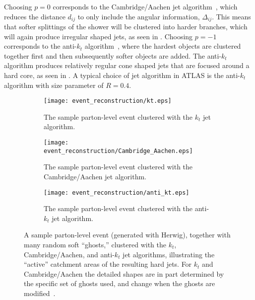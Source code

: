Choosing $p=0$ corresponds to the Cambridge/Aachen jet algorithm~\cite{Dokshitzer:1997in}, which reduces the distance $d_{ij}$ to only include the angular information, $\Delta_{ij}$.
This means that softer splittings of the shower will be clustered into harder branches, which will again produce irregular shaped jets, as seen in .
Choosing $p=-1$ corresponds to the anti-$k_{t}$ algorithm~\cite{Cacciari:2008gp}, where the hardest objects are clustered together first and then subsequently softer objects are added.
The anti-$k_{t}$ algorithm produces relatively regular cone shaped jets that are focused around a hard core, as seen in .
A typical choice of jet algorithm in ATLAS is the anti-$k_{t}$ algorithm with size parameter of $R=0.4$.

\begin{figure}[htbp]
 \centering
 \begin{subfigure}[t]{0.315\textwidth}
  \centering
  \texttt{[image: event\_reconstruction/kt.eps]}
  \caption[The sample parton-level event clustered with the $k_{t}$ jet algorithm.]{%
   The sample parton-level event clustered with the $k_{t}$ jet algorithm.}
  \label{fig:jet_algorithms_kt}
 \end{subfigure}%
 \quad
 \begin{subfigure}[t]{0.315\textwidth}
  \centering
  \texttt{[image: event\_reconstruction/Cambridge\_Aachen.eps]}
  \caption[The sample parton-level event clustered with the Cambridge/Aachen jet algorithm.]{%
   The sample parton-level event clustered with the Cambridge/Aachen jet algorithm.}
  \label{fig:jet_algorithms_Cambridge_Aachen}
 \end{subfigure}%
 \quad
 \begin{subfigure}[t]{0.315\textwidth}
  \centering
  \texttt{[image: event\_reconstruction/anti\_kt.eps]}
  \caption[The sample parton-level event clustered with the anti-$k_{t}$ jet algorithm.]{%
   The sample parton-level event clustered with the anti-$k_{t}$ jet algorithm.}
  \label{fig:jet_algorithms_anti_kt}
 \end{subfigure}%
 \caption[A sample parton-level event, together with many random soft ``ghosts,'' clustered with three different jet algorithms, illustrating the ``active'' catchment areas of the resulting hard jets.]{%
  A sample parton-level event (generated with Herwig), together with many random soft ``ghosts,'' clustered with the $k_{t}$, Cambridge/Aachen, and anti-$k_{t}$ jet algorithms, illustrating the ``active'' catchment areas of the resulting hard jets.
  For $k_{t}$ and Cambridge/Aachen the detailed shapes are in part determined by the specific set of ghosts used, and change when the ghosts are modified~\cite{Cacciari:2008gp}.}
 \label{fig:jet_algorithms}
\end{figure}



